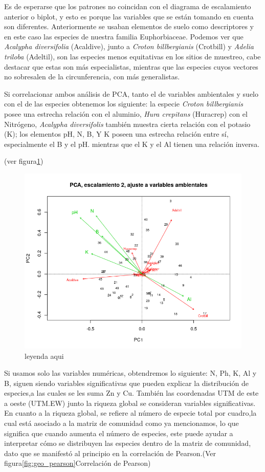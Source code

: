 \documentclass[11pt,]{article}
\begin{document}
Es de esperarse que los patrones no coincidan con el diagrama de
escalamiento anterior o biplot, y esto es porque las variables que se
están tomando en cuenta son diferentes. Anteriormente se usaban
elementos de suelo como descriptores y en este caso las especies de
nuestra familia Euphorbiaceae. Podemos ver que \emph{Acalypha
diversifolia} (Acaldive), junto a \emph{Croton billbergianis} (Crotbill)
y \emph{Adelia triloba} (Adeltil), son las especies menos equitativas en
los sitios de muestreo, cabe destacar que estas son más especialistas,
mientras que las especies cuyos vectores no sobresalen de la
circunferencia, con más generalistas.

Si correlacionar ambos análisis de PCA, tanto el de variables
ambientales y suelo con el de las especies obtenemos los siguiente: la
especie \emph{Croton billbergianis} posee una estrecha relación con el
aluminio, \emph{Hura crepitans} (Huracrep) con el Nitrógeno,
\emph{Acalypha diversifolis} también muestra cierta relación con el
potasio (K); los elementos pH, N, B, Y K poseen una estrecha relación
entre sí, especialmente el B y el pH. mientras que el K y el Al tienen
una relación inversa.

(ver figura\ref{fig:suelo_especie})

\begin{figure}
\centering
\includegraphics{suelo_especie.png}
\caption{\label{fig:suelo_especie}leyenda aqui}
\end{figure}

Si usamos solo las variables numéricas, obtendremos lo siguiente: N, Ph,
K, Al y B, siguen siendo variables significativas que pueden explicar la
distribución de especies,a las cuales se les suma Zn y Cu. También las
coordenadas UTM de este a oeste (UTM.EW) junto la riqueza global se
consideran variables significativas. En cuanto a la riqueza global, se
refiere al número de especie total por cuadro,la cual está asociado a la
matriz de comunidad como ya mencionamos, lo que significa que cuando
aumenta el número de especies, este puede ayudar a interpretar cómo se
distribuyen las especies dentro de la matriz de comunidad, dato que se
manifestó al principio en la correlación de Pearson.(Ver
figura\ref{fig:geo_pearson}Correlación de Pearson)
\end{document}

